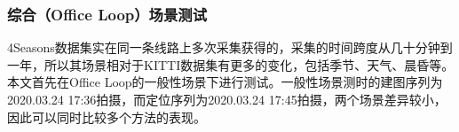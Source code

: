 \subsubsection{综合（Office Loop）场景测试}
4Seasons数据集实在同一条线路上多次采集获得的，采集的时间跨度从几十分钟到一年，所以其场景相对于KITTI数据集有更多的变化，包括季节、天气、晨昏等。本文首先在Office Loop的一般性场景下进行测试。一般性场景测时的建图序列为2020.03.24 17:36拍摄，而定位序列为2020.03.24 17:45拍摄，两个场景差异较小，因此可以同时比较多个方法的表现。

